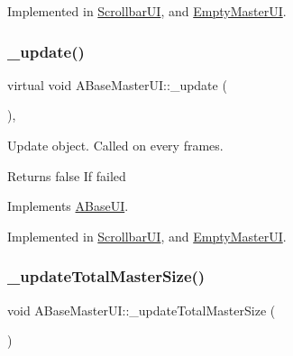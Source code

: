 Implemented in \hyperlink{class_scrollbar_u_i_adac2d8cc8f17d8db4170abe7ff9d3dad}{Scrollbar\+UI}, and \hyperlink{class_empty_master_u_i_a1e2b7cba4b43e28713c7e5d34a80b3a7}{Empty\+Master\+UI}.

\mbox{\label{class_a_base_master_u_i_a6c18f89d96c65d68ee1eabd8d4e1ee19}} 
\subsubsection{\texorpdfstring{\+\_\+update()}{\_update()}}
{\footnotesize\ttfamily virtual void A\+Base\+Master\+U\+I\+::\+\_\+update (\begin{DoxyParamCaption}{ }\end{DoxyParamCaption})\hspace{0.3cm}{\ttfamily [protected]}, {}}



Update object. Called on every frames. 

\begin{DoxyReturn}{Returns}
false If failed 
\end{DoxyReturn}


Implements \hyperlink{class_a_base_u_i_ad4526888fd6a37de4086ba2a1e362759}{A\+Base\+UI}.



Implemented in \hyperlink{class_scrollbar_u_i_a75d909bc72204564034629439f6c0489}{Scrollbar\+UI}, and \hyperlink{class_empty_master_u_i_a1bf9ef11a2fa21e5637939ec6c959010}{Empty\+Master\+UI}.

\mbox{\label{class_a_base_master_u_i_a2bb6ad21838a1a2e1ce0bf7fb24a3330}} 
\subsubsection{\texorpdfstring{\+\_\+update\+Total\+Master\+Size()}{\_updateTotalMasterSize()}}
{\footnotesize\ttfamily void A\+Base\+Master\+U\+I\+::\+\_\+update\+Total\+Master\+Size (\begin{DoxyParamCaption}{ }\end{DoxyParamCaption})\hspace{0.3cm}{\ttfamily [protected]}}



